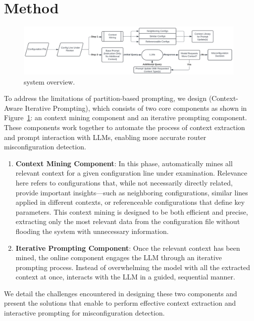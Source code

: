 \section{Method}
\label{sec:method}

\begin{figure}[t]
    \centering
    \includegraphics[width=\linewidth]{figs/caip.pdf}
    \caption{\sysname{} system overview.}
    \label{fig:overview}
\end{figure}

To address the limitations of partition-based prompting, we design \sysname{} (Context-Aware Iterative Prompting), which consists of two core components as shown in Figure~\ref{fig:overview}: an context mining component and an iterative prompting component. These components work together to automate the process of context extraction and prompt interaction with LLMs, enabling more accurate router misconfiguration detection.
\begin{enumerate}
    \item \textbf{Context Mining Component}:
In this phase, \sysname{} automatically mines all relevant context for a given configuration line under examination. Relevance here refers to configurations that, while not necessarily directly related, provide important insights—such as neighboring configurations, similar lines applied in different contexts, or referenceable configurations that define key parameters. This context mining is designed to be both efficient and precise, extracting only the most relevant data from the configuration file without flooding the system with unnecessary information.

    \item \textbf{Iterative Prompting Component}:
Once the relevant context has been mined, the online component engages the LLM through an iterative prompting process. Instead of overwhelming the model with all the extracted context at once, \sysname{} interacts with the LLM in a guided, sequential manner.
\end{enumerate}

We detail the challenges encountered in designing these two components and present the solutions that enable \sysname{} to perform effective context extraction and interactive prompting for misconfiguration detection.
